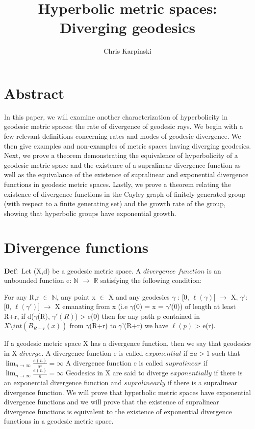 \documentclass[11pt]{article}
\newcommand{\vs}{\vskip10pt}
\begin{document}
	
	\title{Hyperbolic metric spaces: Diverging geodesics}
	\author{Chris Karpinski}
	\maketitle
	
	\section{Abstract}
	
	In this paper, we will examine another characterization of hyperbolicity in geodesic metric spaces: the rate of divergence of geodesic rays. We begin with a few relevant definitions concerning rates and modes of geodesic divergence. We then give examples and non-examples of metric spaces having diverging geodesics. Next, we prove a theorem demonstrating the equivalence of hyperbolicity of a geodesic metric space and the existence of a supralinear divergence function as well as the equivalance of the existence of supralinear and exponential divergence functions in geodesic metric spaces. Lastly, we prove a theorem relating the existence of divergence functions in the Cayley graph of finitely generated group (with respect to a finite generating set) and the growth rate of the group, showing that hyperbolic groups have exponential growth. 
	
	\section{Divergence functions}
	
	$\mathbf{Def:}$ Let (X,d) be a geodesic metric space. A $\mathit{divergence}$ $\mathit{ function}$ is an unbounded function e: $\mathbb{N}$ $\rightarrow$ $\mathbb{R}$ satisfying the following condition:
	
	\vs
	
	For any R,r $\in$ $\mathbb{N}$, any point x $\in$ X and any geodesics $\gamma$ : [0, $\ell(\gamma)$] $\rightarrow$ X, $\gamma$': [0, $\ell(\gamma')$] $\rightarrow$ X emanating from x (i.e $\gamma$(0) = x = $\gamma$'(0)) of length at least R+r, if d($\gamma$(R), $\gamma'(R)$) > e(0) then for any path p contained in $X \setminus int(B_{R+r}(x))$ from $\gamma$(R+r) to $\gamma$'(R+r) we have $\ell (p) $ > e(r).
	
	\vs 
	
	If a geodesic metric space X has a divergence function, then we say that geodesics in X $\mathit{diverge}$. 
	\vs
	A divergence function e is called $\mathit{exponential }$ if $\exists a > 1 $ such that $\lim_{n \rightarrow \infty} \frac{e(n)}{a^n} = \infty$
	\vs 
	A divergence function e is called $\mathit{supralinear}$ if $\lim_{n \rightarrow \infty} \frac{e(n)}{n} = \infty$
	\vs
	Geodesics in X are said to diverge $\mathit{exponentially}$ if there is an exponential divergence function and $\mathit{supralinearly}$ if there is a supralinear divergence function. We will prove that hyperbolic metric spaces have exponential divergence functions and we will prove that the existence of supralinear divergence functions is equivalent to the existence of exponential divergence functions in a geodesic metric space. 
	
\end{document}
